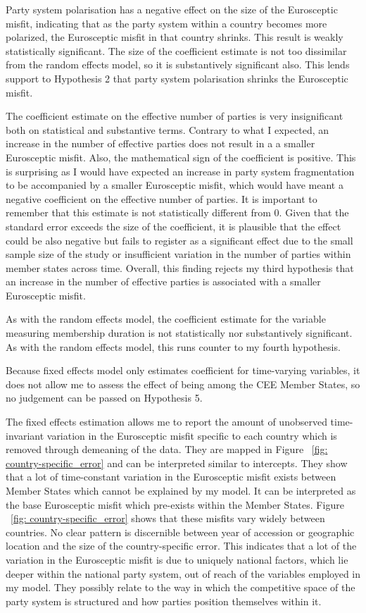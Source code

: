 Party system polarisation has a negative effect on the size of the Eurosceptic misfit, indicating that as the party system within a country becomes more polarized, the Eurosceptic misfit in that country shrinks. This result is weakly statistically significant. The size of the coefficient estimate is not too dissimilar from the random effects model, so it is substantively significant also. This lends support to Hypothesis 2 that party system polarisation shrinks the Eurosceptic misfit.

The coefficient estimate on the effective number of parties is very insignificant both on statistical and substantive terms. Contrary to what I expected, an increase in the number of effective parties does not result in a a smaller Eurosceptic misfit. Also, the mathematical sign of the coefficient is positive. This is surprising as I would have expected an increase in party system fragmentation to be accompanied by a smaller Eurosceptic misfit, which would have meant a negative coefficient on the effective number of parties. It is important to remember that this estimate is not statistically different from 0. Given that the standard error exceeds the size of the coefficient, it is plausible that the effect could be also negative but fails to register as a significant effect due to the small sample size of the study or insufficient variation in the number of parties within member states across time. Overall, this finding rejects my third hypothesis that an increase in the number of effective parties is associated with a smaller Eurosceptic misfit.

As with the random effects model, the coefficient estimate for the variable measuring membership duration is not statistically nor substantively significant. As with the random effects model, this runs counter to my fourth hypothesis. 

Because fixed effects model only estimates coefficient for time-varying variables, it does not allow me to assess the effect of being among the CEE Member States, so no judgement can be passed on Hypothesis 5.

The fixed effects estimation allows me to report the amount of unobserved time-invariant variation in the Eurosceptic misfit specific to each country which is removed through demeaning of the data. They are mapped in Figure ~\ref{fig: country-specific_error} and can be interpreted similar to intercepts. They show that a lot of time-constant variation in the Eurosceptic misfit exists between Member States which cannot be explained by my model. It can be interpreted as the base Eurosceptic misfit which pre-exists within the Member States. Figure ~\ref{fig: country-specific_error} shows that these misfits vary widely between countries. No clear pattern is discernible between year of accession or geographic location and the size of the country-specific error. This indicates that a lot of the variation in the Eurosceptic misfit is due to uniquely national factors, which lie deeper within the national party system, out of reach of the variables employed in my model. They possibly relate to the way in which the competitive space of the party system is structured and how parties position themselves within it. 

